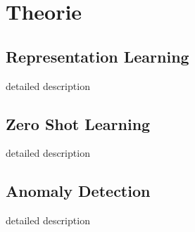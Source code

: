 \chapter{Theorie}\label{theory}
\section{Representation Learning}
detailed description
\section{Zero Shot Learning}
detailed description
\section{Anomaly Detection}
detailed description
